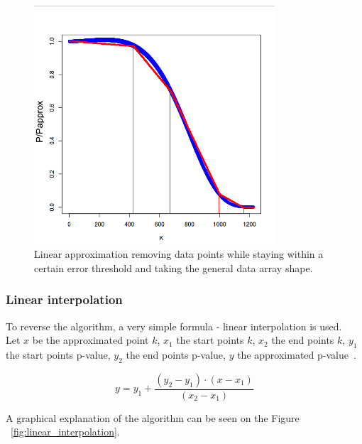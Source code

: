 \documentclass[12pt]{article}
\begin{document}
{\begin{figure}[H]
  \centering
  \includegraphics[width=0.8\textwidth]{linear_approximation}
  \caption{Linear approximation removing data points while staying within a certain error threshold and taking the general data array shape.}
  \label{fig:linear_approximation}
\end{figure}

\subsubsection{Linear interpolation}
To reverse the algorithm, a very simple formula - linear interpolation is used.\\
Let $x$ be the approximated point $k$, $x_1$ the start points $k$, $x_2$ the end points $k$, $y_1$ the start points p-value, $y_2$ the end points p-value, $y$ the approximated p-value~\cite{linear_interpolation}.

\begin{equation}
  y = y_1 + \frac{(y_2 - y_1) \cdot (x - x_1)}{(x_2 - x_1)}
\end{equation}

A graphical explanation of the algorithm can be seen on the Figure ~\ref{fig:linear_interpolation}.

}
\end{document}
